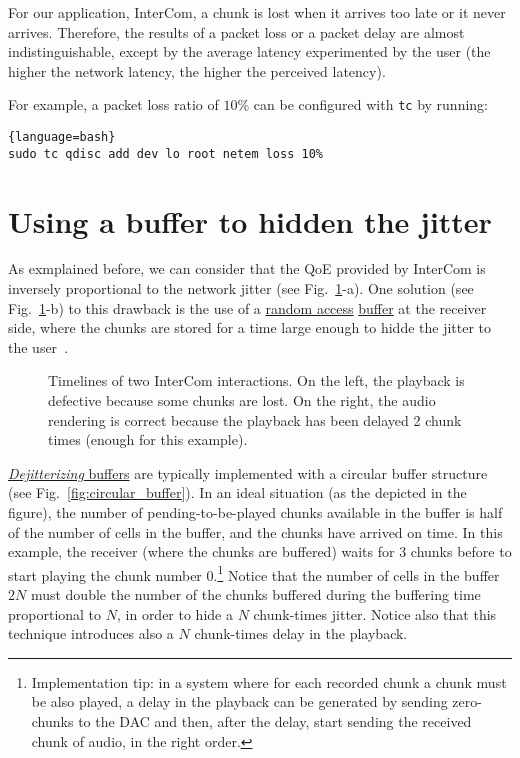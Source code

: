 For our application, InterCom, a chunk is lost when it arrives too
late or it never arrives. Therefore, the results of a packet loss or a
packet delay are almost indistinguishable, except by the average
latency experimented by the user (the higher the network latency, the
higher the perceived latency).

For example, a packet loss ratio of $10\%$ can be configured with
\verb|tc| by running:

  \begin{lstlisting}{language=bash}
sudo tc qdisc add dev lo root netem loss 10%
  \end{lstlisting}

\section{Using a buffer to hidden the jitter}

As exmplained before, we can consider that the QoE provided by
InterCom is inversely proportional to the network jitter (see
Fig.~\ref{fig:timelines}-a). One solution (see
Fig.~\ref{fig:timelines}-b) to this drawback is the use of a
\href{https://en.wikipedia.org/wiki/Random_access}{random access}
\href{https://en.wikipedia.org/wiki/Data_buffer}{buffer} at the
receiver side, where the chunks are stored for a time large enough to
hidde the jitter to the user~\cite{Kurose-Ross}.

\begin{figure}
  \begin{center}
  \end{center}
  \caption{Timelines of two InterCom interactions. On the left, the
    playback is defective because some chunks are lost. On the right,
    the audio rendering is correct because the playback has been
    delayed 2 chunk times (enough for this example).}
  \label{fig:timelines}
\end{figure}

\href{https://en.wikipedia.org/wiki/Jitter#Jitter_buffers}{\emph{Dejitterizing}
  buffers} are typically implemented with a circular buffer structure
(see Fig.~\ref{fig:circular_buffer}). In an ideal situation (as the
depicted in the figure), the number of pending-to-be-played chunks
available in the buffer is half of the number of cells in the buffer,
and the chunks have arrived on time. In this example, the receiver
(where the chunks are buffered) waits for 3 chunks before to start
playing the chunk number 0.\footnote{Implementation tip: in a system
where for each recorded chunk a chunk must be also played, a delay in
the playback can be generated by sending zero-chunks to the DAC and
then, after the delay, start sending the received chunk of audio, in
the right order.} Notice that the number of cells in the buffer $2N$
must double the number of the chunks buffered during the buffering
time proportional to $N$, in order to hide a $N$ chunk-times
jitter. Notice also that this technique introduces also a $N$
chunk-times delay in the playback.

